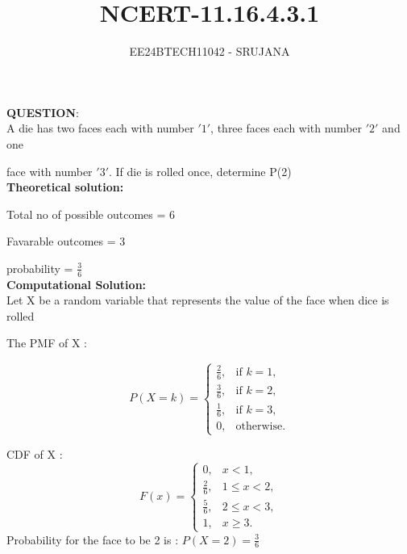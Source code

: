 \documentclass[journal]{IEEEtran}
\begin{document}

\vspace{3cm}

\title{NCERT-11.16.4.3.1}
\author{EE24BTECH11042 - SRUJANA}
{\let\newpage\relax\maketitle}

\renewcommand{\thefigure}{\theenumi}
\renewcommand{\thetable}{\theenumi}
\setlength{\intextsep}{10pt} 

\renewcommand{\thetable}{\theenumi}

\textbf{QUESTION}:\\

A die has two faces each with number $'1'$, three faces each with number $'2'$ and one 

face with number $'3'$. If die is rolled once, determine P(2)\\


\textbf{Theoretical solution: }

Total no of possible outcomes = 6 

Favarable outcomes = 3

probability = $\frac{3}{6}$\\

\textbf{Computational Solution:}\\

Let X be a random variable that represents the value of the face when dice is rolled

The PMF of X :

\[
P(X = k) =
\begin{cases}
    \frac{2}{6}, & \text{if } k = 1, \\
    \frac{3}{6}, & \text{if } k = 2, \\
    \frac{1}{6}, & \text{if } k = 3, \\
    0, & \text{otherwise}.
\end{cases}
\]

CDF of X : 
\[
F(x) =
\begin{cases}
    0, & x < 1, \\
    \frac{2}{6}, & 1 \leq x < 2, \\
    \frac{5}{6}, & 2 \leq x < 3, \\
    1, & x \geq 3.
\end{cases}
\]
Probability for the face to be 2 is :
$P(X = 2) = \frac{3}{6}$\\
\end{document}
